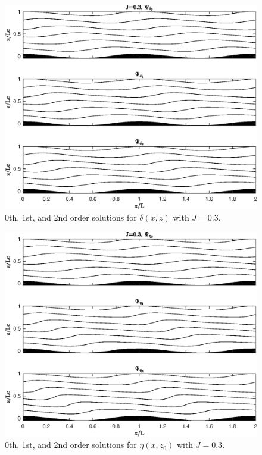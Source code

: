 \documentclass[12pt]{article}
\begin{document}
\begin{figure}
	\centering
	\includegraphics[width=1\textwidth]{delta_solutions.eps}
	\caption{0th, 1st, and 2nd order solutions for $\delta(x,z)$ with $J=0.3$.}
\end{figure}

\begin{figure}
	\centering
	\includegraphics[width=1\textwidth]{eta_solutions.eps}
	\caption{0th, 1st, and 2nd order solutions for $\eta(x,z_0)$ with $J=0.3$.}
\end{figure}
\end{document}
